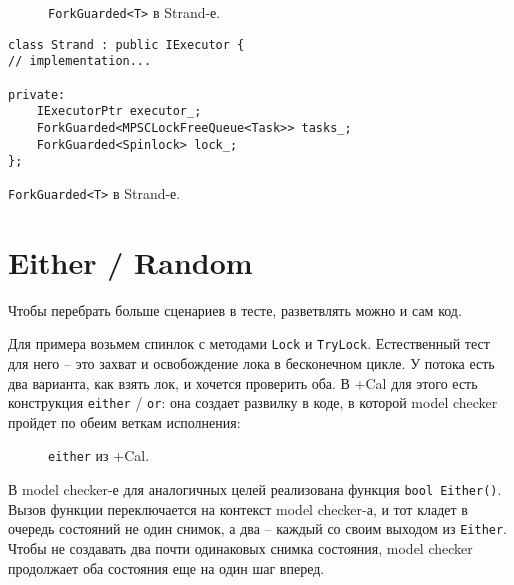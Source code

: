 
\begin{figure}
	\bigskip
	\caption{\texttt{ForkGuarded<T>} в Strand-е.}
\end{figure}

\else

\begin{listing}
	\centering
	
	\begin{verbatim}
class Strand : public IExecutor {
// implementation...

private:
	IExecutorPtr executor_;
	ForkGuarded<MPSCLockFreeQueue<Task>> tasks_;
	ForkGuarded<Spinlock> lock_;
};
	\end{verbatim}
	\caption{\texttt{ForkGuarded<T>} в Strand-е.}
	
\end{listing}

\fi


\section{Either / Random}

Чтобы перебрать больше сценариев в тесте, разветвлять можно и сам код. 

Для примера возьмем спинлок с методами \texttt{Lock} и \texttt{TryLock}. Естественный тест для него – это захват и освобождение лока в бесконечном цикле. У потока есть два варианта, как взять лок, и хочется проверить оба. В +Cal для этого есть конструкция \texttt{either} / \texttt{or}: она создает развилку в коде, в которой model checker пройдет по обеим веткам исполнения:

\begin{figure}
	\bigskip
	\caption{\texttt{either} из +Cal.}
\end{figure}


В model checker-е для аналогичных целей реализована функция \texttt{bool Either()}. Вызов функции переключается на контекст model checker-а, и тот кладет в очередь состояний не один снимок, а два – каждый со своим выходом из \texttt{Either}. Чтобы не создавать два почти одинаковых снимка состояния, model checker продолжает оба состояния еще на один шаг вперед. 


